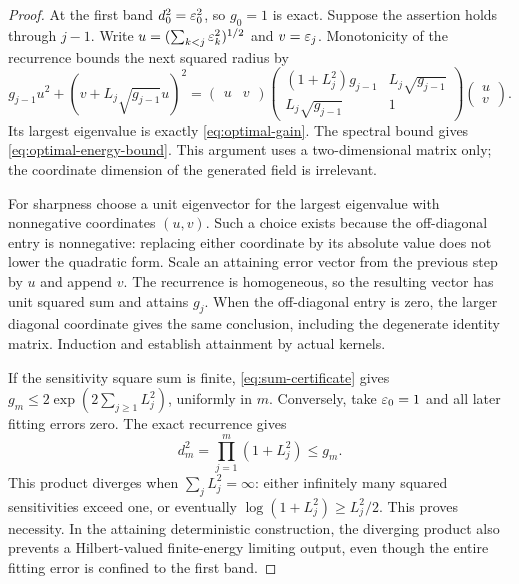 \begin{proof}
At the first band $d_0^2=\varepsilon_0^2$, so $g_0=1$ is exact. Suppose the assertion holds through $j-1$. Write
$u=(\sum_{k<j}\varepsilon_k^2)^{1/2}$ and $v=\varepsilon_j$. Monotonicity of the recurrence bounds the next squared radius by
\[
 g_{j-1}u^2+(v+L_j\sqrt{g_{j-1}}u)^2
 =\begin{pmatrix}u&v\end{pmatrix}
 \begin{pmatrix}
 (1+L_j^2)g_{j-1}&L_j\sqrt{g_{j-1}}\\
 L_j\sqrt{g_{j-1}}&1
 \end{pmatrix}
 \begin{pmatrix}u\\v\end{pmatrix}.
\]
Its largest eigenvalue is exactly \eqref{eq:optimal-gain}. The spectral bound gives \eqref{eq:optimal-energy-bound}. This argument uses a two-dimensional matrix only; the coordinate dimension of the generated field is irrelevant.

For sharpness choose a unit eigenvector for the largest eigenvalue with nonnegative coordinates $(u,v)$. Such a choice exists because the off-diagonal entry is nonnegative: replacing either coordinate by its absolute value does not lower the quadratic form. Scale an attaining error vector from the previous step by $u$ and append $v$. The recurrence is homogeneous, so the resulting vector has unit squared sum and attains $g_j$. When the off-diagonal entry is zero, the larger diagonal coordinate gives the same conclusion, including the degenerate identity matrix. Induction and  establish attainment by actual kernels.

If the sensitivity square sum is finite, \eqref{eq:sum-certificate} gives
$g_m\le2\exp(2\sum_{j\ge1}L_j^2)$, uniformly in $m$. Conversely, take $\varepsilon_0=1$ and all later fitting errors zero. The exact recurrence gives
\begin{equation}\label{eq:seed-product}
 d_m^2=\prod_{j=1}^m(1+L_j^2)\le g_m.
\end{equation}
This product diverges when $\sum_jL_j^2=\infty$: either infinitely many squared sensitivities exceed one, or eventually
$\log(1+L_j^2)\ge L_j^2/2$.
This proves necessity. In the attaining deterministic construction, the diverging product also prevents a Hilbert-valued finite-energy limiting output, even though the entire fitting error is confined to the first band.
\end{proof}

